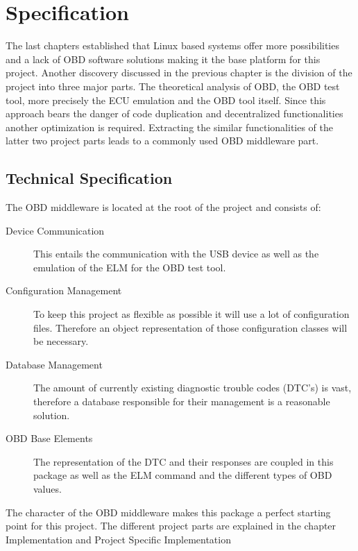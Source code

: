 

\chapter{Specification}
The last chapters established that Linux based systems offer more possibilities and a lack of OBD software solutions making it the base platform for 
this project. Another discovery discussed in the previous chapter is the division of the project into three major parts. The theoretical analysis of 
OBD, the OBD test tool, more precisely the ECU emulation and the OBD tool itself. Since this approach bears the danger of code duplication and 
decentralized functionalities another optimization is required.  Extracting the similar functionalities of the latter two project parts leads to a 
commonly used OBD middleware part. 

\section{Technical Specification}
The OBD middleware is located at the root of the project and consists of:
\begin{description}
\item[Device Communication]

This entails the communication with the USB device as well as the emulation of the ELM for the OBD test tool.
\item[Configuration Management]

To keep this project as flexible as possible it will use a lot of configuration files. Therefore an object representation of those configuration 
classes will be necessary.
\item[Database Management]

The amount of currently existing diagnostic trouble codes (DTC’s) is vast, therefore a database responsible for their management is a reasonable 
solution.
\item[OBD Base Elements]

The representation of the DTC and their responses are coupled in this package as well as the ELM command and the different types of OBD values.
\end{description}

The character of the OBD middleware makes this package a perfect starting point for this project. 
The different project parts are explained in the chapter Implementation and Project Specific Implementation

